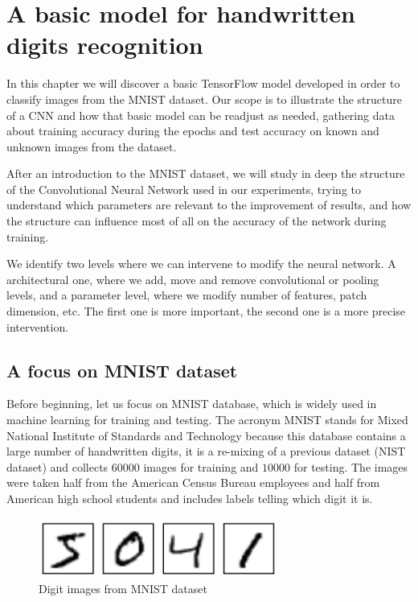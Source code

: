 \chapter{A basic model for handwritten digits recognition}\label{ch:basic_tf_model}

In this chapter we will discover a basic TensorFlow model developed in order to classify images from the MNIST dataset. Our scope is to illustrate the structure of a \acs{CNN} and how that basic model can be readjust as needed, gathering data about training accuracy during the epochs and test accuracy on known and unknown images from the dataset.

After an introduction to the MNIST dataset, we will study in deep the structure of the Convolutional Neural Network used in our experiments, trying to understand which parameters are relevant to the improvement of results, and how the structure can influence most of all on the accuracy of the network during training.

We identify two levels where we can intervene to modify the neural network. A architectural one, where we add, move and remove convolutional or pooling levels, and a parameter level, where we modify number of features, patch dimension, etc. The first one is more important, the second one is a more precise intervention.

\section{A focus on MNIST dataset}

Before beginning, let us focus on MNIST database, which is widely used in machine learning for training and testing. The acronym MNIST stands for Mixed National Institute of Standards and Technology because this database contains a large number of handwritten digits, it is a re-mixing of a previous dataset (NIST dataset) and collects $60000$ images for training and $10000$ for testing. The images were taken half from the American Census Bureau employees and half from American high school students and includes labels telling which digit it is.

\begin{figure}
	\centering
	\includegraphics[width=0.7\textwidth]{Images/MNIST_images}
	\caption{Digit images from MNIST dataset}
	\label{fig:MNIST_images}
\end{figure}


